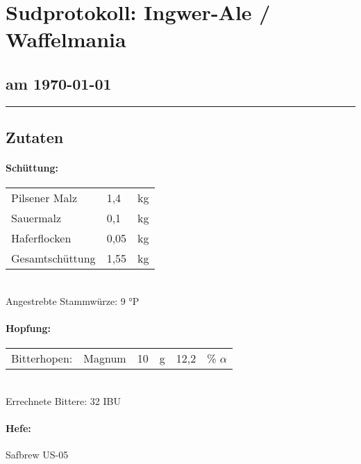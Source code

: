 \documentclass[12pt,oneside,a4paper]{scrartcl}
\begin{document}
	\begin{minipage}[c]{0.70\textwidth}
		\section*{\hspace{-.4cm}Sudprotokoll: Ingwer-Ale / Waffelmania}
	\end{minipage}
	\begin{minipage}[c]{0.29\textwidth}
		\subsection*{am \today}
	\end{minipage}
	\rule{\textwidth}{1pt}
%
\subsection*{Zutaten}
%
\paragraph{Schüttung:}
	\begin{tabular}[t]{m{8cm} m{2cm} m{1cm}}
		Pilsener Malz & 1,4 & kg\bigstrut\\
		Sauermalz & 0,1 & kg\bigstrut\\
		Haferflocken & 0,05 & kg \bigstrut\\ \hline
		Gesamtschüttung & 1,55 & kg\bigstrut
	\end{tabular}\\

\vspace{.25cm}
\hspace{1cm}Angestrebte Stammwürze: 9 °P
%
\paragraph{Hopfung:}
	\begin{tabular}[t]{m{2cm} m{5cm} m{0.5cm} m{1cm} m{0.5cm} m{1cm}}
		Bitterhopen: & Magnum & 10 & g & 12,2 & \% $\alpha$ \\
	\end{tabular}\\

\vspace{.25cm}
\hspace{1cm}Errechnete Bittere: 32 IBU
%
\paragraph{Hefe:}
	Safbrew US-05
%
\end{document}
